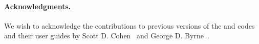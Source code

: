 \paragraph{Acknowledgments.}
We wish to acknowledge the contributions to previous versions of the
{\cvode} and {\pvode} codes and their user guides by Scott D. Cohen~\cite{CoHi:94}
and George D. Byrne~\cite{ByHi:98}.


